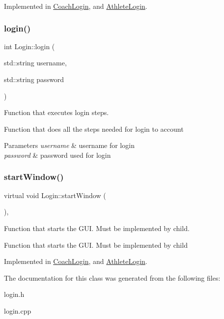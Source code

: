 Implemented in \mbox{\hyperlink{classCoachLogin_a7b4a4bc451520e54bdba247204dd072d}{Coach\+Login}}, and \mbox{\hyperlink{classAthleteLogin_a739caa9c5aed1003d2f19c49ec4a8854}{Athlete\+Login}}.

\mbox{\label{classLogin_a6c995557205cfdf5772555d007a7ab2a}} 
\subsubsection{\texorpdfstring{login()}{login()}}
{\footnotesize\ttfamily int Login\+::login (\begin{DoxyParamCaption}\item[{std\+::string}]{username,  }\item[{std\+::string}]{password }\end{DoxyParamCaption})}



Function that executes login steps. 

Function that does all the steps needed for login to account 
\begin{DoxyParams}{Parameters}
{\em username} & username for login \\
\hline
{\em password} & password used for login \\
\hline
\end{DoxyParams}
\mbox{\label{classLogin_a91bc4d81c3d966d97320a988af1c4363}} 
\subsubsection{\texorpdfstring{startWindow()}{startWindow()}}
{\footnotesize\ttfamily virtual void Login\+::start\+Window (\begin{DoxyParamCaption}{ }\end{DoxyParamCaption})\hspace{0.3cm}{\ttfamily [protected]}, {}}



Function that starts the G\+UI. Must be implemented by child. 

Function that starts the G\+UI. Must be implemented by child 

Implemented in \mbox{\hyperlink{classCoachLogin_ab6357836d5e7cb4b82bca85a1f5c67a0}{Coach\+Login}}, and \mbox{\hyperlink{classAthleteLogin_a2a6d59d4e84de8c26fd9736c9b569f8e}{Athlete\+Login}}.



The documentation for this class was generated from the following files\+:\begin{DoxyCompactItemize}
\item 
login.\+h\item 
login.\+cpp\end{DoxyCompactItemize}
